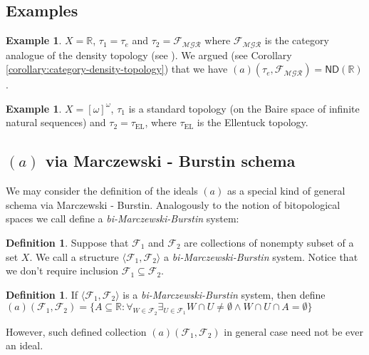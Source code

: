\documentclass[12pt]{amsart}
\theoremstyle{plain}
\theoremstyle{definition}
\newtheorem{definition}[theorem]{Definition}
\newtheorem{example}[theorem]{Example}
\theoremstyle{remark}
\newcommand{\meager}{{\mathcal{MGR}}}
\newcommand{\real}{\mathbb{R}}
\newcommand{\cF}{{\mathcal F}}
\newcommand{\aideal}{\mathit{(a)}}
\newcommand{\biMB}{bi-Marczewski-Burstin}
\newcommand{\tauEllentuck}{\tau_{\mathrm{EL}}}
\begin{document}

\subsection{Examples}
\begin{example}
$X = \real$,
$\tau_1 = \tau_e$ and
$\tau_2 = \cF_{\meager}$
where $\cF_{\meager}$ is the category analogue of the density topology (see \cite{PWBW}).
We argued (see Corollary \ref{corollary:category-density-topology}) that we have 
$(a)(\tau_e, \cF_{\meager}) = \mathsf{ND}(\real)$.
\end{example}
\begin{example}
\label{example:ellentuck}
$X = [\omega]^\omega$,
$\tau_1$ is a standard topology (on the Baire space of infinite natural sequences) and
$\tau_2 = \tauEllentuck$, where $\tauEllentuck$ is the Ellentuck topology.
\end{example}

\subsection{$\aideal$ via Marczewski - Burstin schema}

We may consider the definition of the ideals $\aideal$
as a special kind of general schema via Marczewski - Burstin.
Analogously to the notion of bitopological spaces we call define
a {\it\biMB{}} system:

\begin{definition}
Suppose that $\cF_1$ and $\cF_2$ are collections of nonempty
subset of a set $X$. 
We call a structure $\langle \cF_1, \cF_2 \rangle$ a {\it\biMB{}} system.
Notice that we don't require inclusion $\cF_1 \subseteq \cF_2$.
\end{definition}

\begin{definition}
If $\langle \cF_1, \cF_2 \rangle$ is a {\it\biMB{}} system,
then define 
$\aideal(\cF_1, \cF_2) = \lbrace A \subseteq \real\colon 
\forall_{W\in \cF_2} \exists_{U \in \cF_1}
W \cap U \not= \emptyset \wedge W \cap U \cap A = \emptyset
\rbrace$ 
\end{definition}

However, such defined collection $\aideal(\cF_1, \cF_2)$
in general case need not be ever an ideal.
\end{document}
